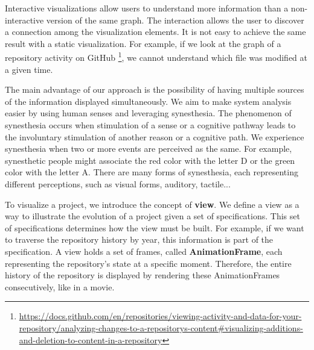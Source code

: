 Interactive visualizations allow users to understand more information than a non-interactive version of the same graph. The interaction allows the user to discover a connection among the visualization elements. It is not easy to achieve the same result with a static visualization. For example, if we look at the graph of a repository activity on GitHub \footnote{\url{https://docs.github.com/en/repositories/viewing-activity-and-data-for-your-repository/analyzing-changes-to-a-repositorys-content\#visualizing-additions-and-deletion-to-content-in-a-repository}}, we cannot understand which file was modified at a given time. 

The main advantage of our approach is the possibility of having multiple sources of the information displayed simultaneously. We aim to make system analysis easier by using human senses and leveraging synesthesia. The phenomenon of synesthesia occurs when stimulation of a sense or a cognitive pathway leads to the involuntary stimulation of another reason or a cognitive path. We experience synesthesia when two or more events are perceived as the same. 
For example, synesthetic people might associate the red color with the letter D or the green color with the letter A. 
There are many forms of synesthesia, each representing different perceptions, such as visual forms, auditory, tactile...

To visualize a project, we introduce the concept of \textbf{view}. We define a view as a way to illustrate the evolution of a project given a set of specifications. This set of specifications determines how the view must be built. For example, if we want to traverse the repository history by year, this information is part of the specification. A view holds a set of frames, called \textbf{AnimationFrame}, each representing the repository's state at a specific moment. Therefore, the entire history of the repository is displayed by rendering these AnimationFrames consecutively, like in a movie. 

